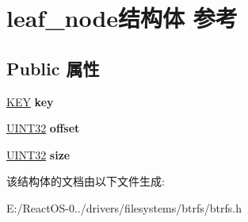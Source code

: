 \hypertarget{structleaf__node}{}\section{leaf\+\_\+node结构体 参考}
\label{structleaf__node}
\subsection*{Public 属性}
\begin{DoxyCompactItemize}
\item 
\mbox{\label{structleaf__node_a4db1bcc8d60be42c20770cf103885b9c}} 
\hyperlink{struct_k_e_y}{K\+EY} {\bfseries key}
\item 
\mbox{\label{structleaf__node_afeb3bcb2a0af140d136dba72eff0140e}} 
\hyperlink{_processor_bind_8h_ae1e6edbbc26d6fbc71a90190d0266018}{U\+I\+N\+T32} {\bfseries offset}
\item 
\mbox{\label{structleaf__node_adcfaa60786e8d5ccb63cc7da33bd84d9}} 
\hyperlink{_processor_bind_8h_ae1e6edbbc26d6fbc71a90190d0266018}{U\+I\+N\+T32} {\bfseries size}
\end{DoxyCompactItemize}


该结构体的文档由以下文件生成\+:\begin{DoxyCompactItemize}
\item 
E\+:/\+React\+O\+S-\/0../drivers/filesystems/btrfs/btrfs.\+h\end{DoxyCompactItemize}
